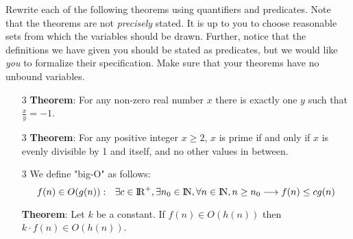 %
%
\item [9] Rewrite  each of the following  theorems using quantifiers and  predicates. Note that the theorems are not {\em precisely} stated. It is up to you to choose reasonable sets from which the variables should be drawn. Further, notice that the definitions we have given you should be stated as predicates, but we would like {\em you} to formalize their specification. Make sure that your theorems have no unbound variables. 


  \begin{enumerate}
  
%
%
  \item[3]
    \textbf{Theorem}: For any non-zero real number $x$ there is exactly one $y$ such that $\frac{x}{y}=-1$.
  \vspace{2in}

%
%
  \item [3] \textbf{Theorem}: For any positive integer $x \geq 2$, $x$ is prime if and only if $x$ is evenly divisible by 1 and itself, and no other values in between.
  \vspace{2in}

 
%
%
  \item [3] We define "big-O" as follows:
  \[f(n)\in O(g(n)) : ~~\exists c\in\R^{+},\exists n_0\in\N, \forall n\in\N, n\geq n_0 \longrightarrow f(n)\leq cg(n)\]
  
  \textbf{Theorem}: Let $k$ be a constant. If $f(n)\in O(h(n))$ then $k\cdot f(n) \in O(h(n))$.
  \vspace{2.5in}
  
    \end{enumerate}



